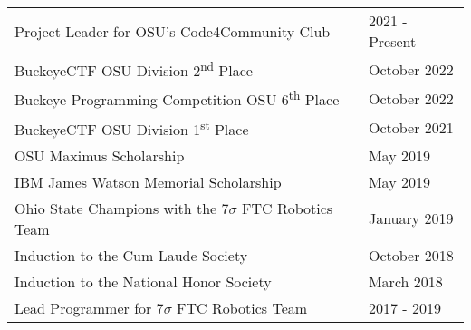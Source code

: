 \documentclass[line, margin]{res}
\begin{document}
\begin{resume}
  \begin{tabularx}{\linewidth}{ @{}X  p{1in} }
    Project Leader for OSU's Code4Community Club &                     2021 - Present \\
    BuckeyeCTF OSU Division 2\textsuperscript{nd} Place &              October 2022 \\
    Buckeye Programming Competition OSU 6\textsuperscript{th} Place &  October 2022 \\
    BuckeyeCTF OSU Division 1\textsuperscript{st} Place &              October 2021 \\
    OSU Maximus Scholarship &                                          May 2019 \\
    IBM James Watson Memorial Scholarship &                            May 2019 \\
    Ohio State Champions with the 7$\sigma$ FTC Robotics Team &        January 2019 \\
    Induction to the Cum Laude Society &                               October 2018 \\
    Induction to the National Honor Society &                          March 2018 \\
    Lead Programmer for 7$\sigma$ FTC Robotics Team  &                 2017 - 2019 \\
  \end{tabularx}

\end{resume}
\end{document}

